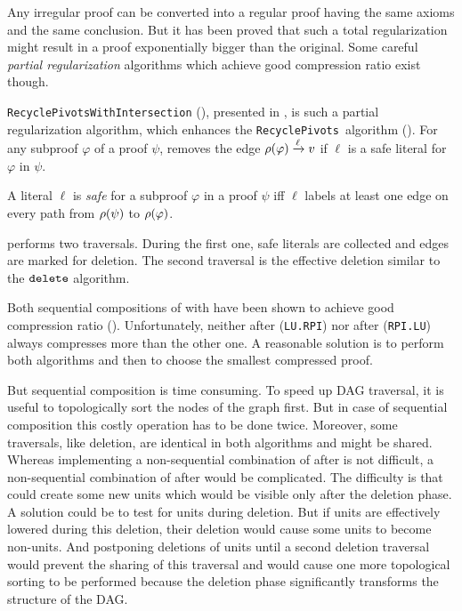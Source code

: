 \documentclass{llncs}
\begin{document}
Any irregular proof can be converted into a regular proof having the same axioms and the same
conclusion. But it has been proved \cite{Goerdt} that such a total regularization might result in a
proof exponentially bigger than the original. Some careful \emph{partial regularization} algorithms
which achieve good compression ratio exist though.

\texttt{RecyclePivotsWithIntersection} ({\RPI}), presented in \cite{LURPI}, is such a partial
regularization algorithm, which enhances the \texttt{RecyclePivots}~algorithm (\cite{RP08}).  For
any subproof $\varphi$ of a proof $\psi$, {\RPI} removes the edge $\rho(\varphi) \xrightarrow{\ell}
v$ if $\ell$ is a safe literal for $\varphi$ in $\psi$.

\begin{definition}
A literal $\ell$ is \emph{safe} for a subproof $\varphi$ in a proof $\psi$ iff $\ell$ labels at
least one edge on every path from $\rho(\psi)$ to $\rho(\varphi)$.
\end{definition}

{\RPI} performs two traversals. During the first one, safe literals are collected and edges are
marked for deletion. The second traversal is the effective deletion similar to the
$\FuncSty{delete}$ algorithm.

Both sequential compositions of {\LowerUnits} with {\RPI} have been shown to achieve good
compression ratio (\cite{LURPI}). Unfortunately, neither {\LowerUnits} after
{\RPI} (\texttt{LU.RPI}) nor {\RPI} after {\LowerUnits} (\texttt{RPI.LU}) always compresses more than
the other one. A reasonable solution is to perform both algorithms and then to choose the smallest
compressed proof.

But sequential composition is time consuming. To speed up DAG traversal, it is useful to topologically
sort the nodes of the graph first. But in case of sequential composition this costly operation has to
be done twice. Moreover, some traversals, like deletion, are identical in both algorithms and might
be shared. Whereas implementing a non-sequential combination of {\RPI} after {\LowerUnits} is not
difficult, a non-sequential combination of {\LowerUnits} after {\RPI} would be complicated. The
difficulty is that {\RPI} could create some new units which would be visible only after the deletion
phase.  A solution could be to test for units during deletion. But if units are
effectively lowered during this deletion, their deletion would cause some units to become non-units.
And postponing deletions of units until a second deletion traversal would prevent the sharing of
this traversal and would cause one more topological sorting to be performed because the deletion phase
significantly transforms the structure of the DAG.
\end{document}
